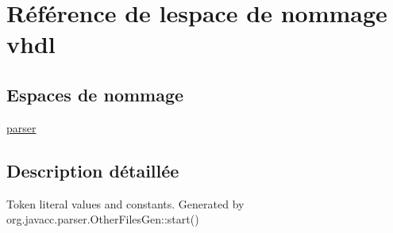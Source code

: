 \hypertarget{namespacevhdl}{}\section{Référence de l\textquotesingle{}espace de nommage vhdl}
\label{namespacevhdl}
\subsection*{Espaces de nommage}
\begin{DoxyCompactItemize}
\item 
 \hyperlink{namespacevhdl_1_1parser}{parser}
\end{DoxyCompactItemize}


\subsection{Description détaillée}
Token literal values and constants. Generated by org.\+javacc.\+parser.\+Other\+Files\+Gen\+::start() 